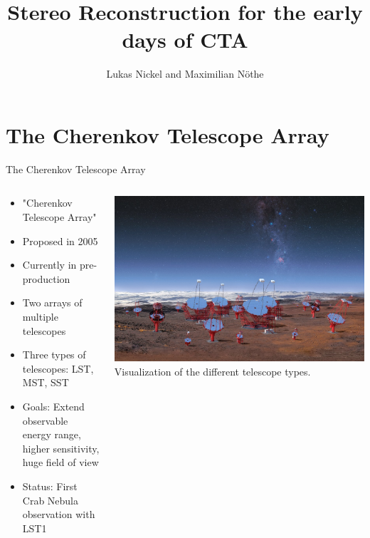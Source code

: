 \documentclass[aspectratio=1610, 9pt]{beamer}
\title{Stereo Reconstruction for the early days of CTA}
\author[L.~Nickel]{Lukas Nickel and Maximilian Nöthe}
\institute[E5b]{Experimentelle Physik 5b}
\begin{document}
\maketitle

\section{The Cherenkov Telescope Array}


\begin{frame}{The Cherenkov Telescope Array}
    \begin{columns}[T] %
        \begin{column}{.45\textwidth}
            \vspace{10pt}
            \begin{itemize}
                \item "Cherenkov Telescope Array"
                \item Proposed in 2005
                \item Currently in pre-production
                \item Two arrays of multiple telescopes
                \item Three types of telescopes: LST, MST, SST
                \item Goals: Extend observable energy range, higher sensitivity, huge field of view
                \item Status: First Crab Nebula observation with LST1
            \end{itemize}
        \end{column}%
        \hfill%
        \begin{column}{.53\textwidth}
            \includegraphics[width=\linewidth]{images/cta_telescopes.jpg}
            Visualization of the different telescope types.
            \cite{cta_telescopes}
        \end{column}%
    \end{columns}
    
\end{frame}
\end{document}
